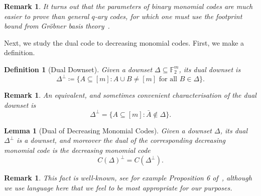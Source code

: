\documentclass{article}
\newcounter{main}[section]
\newtheorem{definition}[main]{Definition}
\newtheorem{lemma}[main]{Lemma}
\newtheorem{remark}[main]{Remark}
\begin{document}
\begin{remark}
    It turns out that the parameters of binary monomial codes are much easier to prove than general $q$-ary codes, for which one must use the footprint bound from Gr\"obner basis theory~\cite{hoholdt1998or,geil2000footprints}.
\end{remark}
Next, we study the dual code to decreasing monomial codes. First, we make a definition.
\begin{definition}[Dual Downset]\label{def:dual_downset}
    Given a downset $\Delta \subseteq \mathbb{F}_2^m$, its dual downset is
    \begin{equation}
        \Delta^\perp \coloneq \{A \subseteq [m]: A \cup B \neq [m] \text{ for all } B \in \Delta\}.
    \end{equation}
\end{definition}
\begin{remark}\label{rmk:equivalent_dual_downset_characterisation}
    An equivalent, and sometimes convenient characterisation of the dual downset is
    \begin{equation}
        \Delta^\perp = \{A \subseteq [m]: \bar{A} \notin \Delta\}.
    \end{equation}
\end{remark}
\begin{lemma}[Dual of Decreasing Monomial Codes]\label{lem:monomial_code_dual}
    Given a downset $\Delta$, its dual $\Delta^\perp$ is a downset, and moreover the dual of the corresponding decreasing monomial code is the decreasing monomial code
    \begin{equation}
        C(\Delta)^\perp = C(\Delta^\perp).
    \end{equation}
\end{lemma}
\begin{remark}
    This fact is well-known, see for example Proposition 6 of~\cite{bardet2016algebraic}, although we use language here that we feel to be most appropriate for our purposes.
\end{remark}
\end{document}
